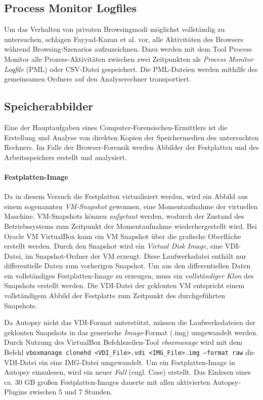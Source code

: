 \subsection*{Process Monitor Logfiles}
\label{subsection:methodik-datensammlung-processmonitorlogfiles}
Um das Verhalten von privaten Browsingmodi möglichst vollständig zu untersuchen, schlagen Fayyad-Kazan et al. \cite{Fayyad.2021} vor, alle Aktivitäten des Browsers während Browsing-Szenarios aufzuzeichnen.
Dazu werden mit dem Tool Process Monitor alle Prozess-Aktivitäten zwischen zwei Zeitpunkten als \textit{Process Monitor Logfile} (PML) oder CSV-Datei gespeichert. \cite{Fayyad.2021, Rochmadi.2017}
Die PML-Dateien werden mithilfe des gemeinsamen Ordners auf den Analyserechner transportiert.

\subsection*{Speicherabbilder}
\label{subsection:methodik-datensammlung-speicherabbilder}
Eine der Hauptaufgaben eines Computer-Forensischen-Ermittlers ist die Erstellung und Analyse von direkten Kopien der Speichermedien des untersuchten Rechners. \cite{Hassan.2019}
Im Falle der Browser-Forensik werden Abbilder der Festplatten und des Arbeitsspeichers erstellt und analysiert.

\paragraph*{Festplatten-Image}
Da in diesem Versuch die Festplatten virtualisiert werden, wird ein Abbild aus einem sogenannten \textit{VM-Snapshot} gewonnen, eine Momentaufnahme der virtuellen Maschine. \cite{Oracle.2020} 
VM-Snapshots können \textit{aufgetaut} werden, wodurch der Zustand des Betriebssystems zum Zeitpunkt der Momentaufnahme wiederhergestellt wird.
Bei Oracle VM VirtualBox kann ein VM Snapshot über die grafische Oberfläche erstellt werden.
Durch den Snapshot wird ein \textit{Virtual Disk Image}, eine VDI-Datei, im Snapshot-Ordner der VM erzeugt. Diese Laufwerksdatei enthält nur differentielle Daten zum vorherigen Snapshot.
Um aus den differentiellen Daten ein vollständiges Festplatten-Image zu erzeugen, muss ein \textit{vollständiger Klon} des Snapshots erstellt werden. Die VDI-Datei der geklonten VM entspricht einem vollständigem Abbild der Festplatte zum Zeitpunkt des durchgeführten Snapshots.

Da Autopsy nicht das VDI-Format unterstützt, müssen die Laufwerksdateien der geklonten Snapshots in das generische \textit{Image}-Format (.img) umgewandelt werden.
Durch Nutzung des VirtualBox Befehlszeilen-Tool \textit{vboxmanage} wird mit dem Befehl \texttt{vboxmanage clonehd <VDI\_File>.vdi <IMG\_File>.img --format raw} die VDI-Datei ein eine IMG-Datei umgewandelt.
Um ein Festplatten-Image in Autopsy einzulesen, wird ein neuer \textit{Fall} (engl. Case) erstellt. Das Einlesen eines ca. 30 GB großen Festplatten-Images dauerte mit allen aktivierten Autopsy-Plugins zwischen 5 und 7 Stunden.

